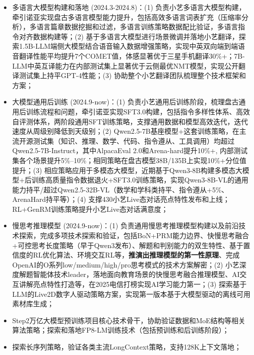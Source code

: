 \documentclass{resume}
\begin{document}
\begin{itemize}
\item 多语言大模型构建和落地 (2024.3-2024.8)：(1) 负责小艺多语言大模型构建，牵引诺亚实现盘古多语言模型能力提升，包括高效多语言词表扩充（压缩率分析），多语言篇章数据挖掘和过滤，多语言训练策略数据配比验证，多语言指令对齐数据构建等；(2) 基于多语言大模型进行场景微调并落地小艺翻译，探索1.5B-LLM端侧大模型结合语音输入数据增强策略，实现中英双向端到端语音翻译性能平均提升7个COMET值，体感显著优于三星手机翻译30\%+；7B-LLM中英互译能力在内部测试集上显著优于云侧最优NMT模型，实现公开翻译测试集上持平GPT-4性能；(3) 协助整个小艺翻译团队梳理整个技术框架和方案；
\item 大模型通用后训练 (2024.9-now)：(1) 负责小艺通用后训练阶段，梳理盘古通用后训练流程和问题，牵引诺亚实现SFT3.0构建，包括指令多样性体系、高效自评测体系，两阶段通用SFT训练策略，支撑通用数据和模型高效迭代，迭代速度从周级别降低到天级别；(2) Qwen2.5-7B基座模型+这套训练策略，在主流开源测试集（知识、推理、数学、代码、指令遵从、工具调用）均超过Qwen2.5-7B-Instruct，其中AlpacaEval 2.0和Arena-hard提升10\%+, 内部测试集各个场景提升5\%--10\%；相同策略在盘古模型38B/135B上实现10\%+分位值提升；(3) 相应策略应用于多模态大模型，近期基于Qwen3-8B构建多模态大模型+后训练高质量指令数据退火+SFT3.0训练策略，实现Qwen3-8B-VL的通用能力持平/超过Qwen2.5-32B-VL（数学和学科类持平、指令遵从+5\%、ArenaHard持平等）；(4) 支撑430小艺Live态对话亮点特性发布和上线；RL+GenRM训练策略提升小艺Live态对话满意度；
\item 慢思考推理模型 (2024.9-now)：(1) 负责通用慢思考推理模型构建以及前沿技术探索，完成多项技术探索和验证，包括BoN+PRM能力边界、快慢思考融合+可控思考长度策略（早于Qwen3发布）、解题和判别能力的双生特性、基于置信度的RL优化算法、环境交互RL等，\textbf{推演出推理模型的第一性原理}、完成OpenAI的O系列low/medium/high/pro思考模式的技术方案解密；(2) 小艺深度解题智能体技术leader，落地面向教育场景的快慢思考融合推理模型、AI交互讲解亮点特性打造等，在2025电信打榜实现AI学习能力第一；(3) 探索基于LLM的Live2D数字人驱动策略方案，实现第一版本基于大模型驱动的离线可用素材库生成；
\end{itemize}

\begin{itemize}
\item Step2万亿大模型预训练项目核心技术骨干，协助验证数据和MoE结构等相关算法策略；探索和落地FP8-LM训练技术（包括预训练和后训练阶段）；
\item 探索长序列策略，验证各类主流LongContext策略，支持128K上下文落地；
\end{itemize}
\end{document}
